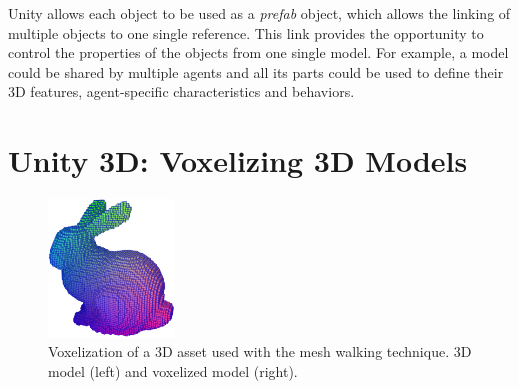 Unity allows each object to be used as a \textit{prefab} object, which allows the linking of multiple objects to one single reference. This link provides the opportunity to control the properties of the objects from one single model. For example, a model could be shared by multiple agents and all its parts could be used to define their 3D features, agent-specific characteristics and behaviors.



\section{Unity 3D: Voxelizing 3D Models}\label{appendix:unity3d-voxelizing-3dmodels}




\begin{figure}[!ht]
        \centering
        \includegraphics[width=0.3\textwidth]{images/voxel_bunny_borders.png}
        \caption{Voxelization of a 3D asset used with the mesh walking technique. 3D model (left) and voxelized model (right). 
        }
        \label{fig:unity-voxelized}
\end{figure}
